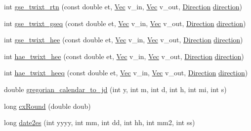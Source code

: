 \begin{DoxyCompactItemize}
\item 
int \hyperlink{cxform-manual_8c_a93d806df9cc3ace3eb999aabc0b200b7}{gse\-\_\-twixt\-\_\-rtn} (const double et, \hyperlink{cxform_8h_ae351b761259db318a538251033f3cb27}{Vec} v\-\_\-in, \hyperlink{cxform_8h_ae351b761259db318a538251033f3cb27}{Vec} v\-\_\-out, \hyperlink{cxform_8h_abc151ba67b4c70f0e8dc3fe894264aa1}{Direction} \hyperlink{cxform_8h_a99f26e6ee9fcd62f75203b5402df8098}{direction})
\item 
int \hyperlink{cxform-manual_8c_a448aadcdd0174393cbc77012b33584ca}{gse\-\_\-twixt\-\_\-gseq} (const double et, \hyperlink{cxform_8h_ae351b761259db318a538251033f3cb27}{Vec} v\-\_\-in, \hyperlink{cxform_8h_ae351b761259db318a538251033f3cb27}{Vec} v\-\_\-out, \hyperlink{cxform_8h_abc151ba67b4c70f0e8dc3fe894264aa1}{Direction} \hyperlink{cxform_8h_a99f26e6ee9fcd62f75203b5402df8098}{direction})
\item 
int \hyperlink{cxform-manual_8c_a968a6f43d870317c644d1e6dcc2ea66c}{gse\-\_\-twixt\-\_\-hee} (const double et, \hyperlink{cxform_8h_ae351b761259db318a538251033f3cb27}{Vec} v\-\_\-in, \hyperlink{cxform_8h_ae351b761259db318a538251033f3cb27}{Vec} v\-\_\-out, \hyperlink{cxform_8h_abc151ba67b4c70f0e8dc3fe894264aa1}{Direction} \hyperlink{cxform_8h_a99f26e6ee9fcd62f75203b5402df8098}{direction})
\item 
int \hyperlink{cxform-manual_8c_ab2f71cd8ff48427b63d28a87e18ebd09}{hae\-\_\-twixt\-\_\-hee} (const double et, \hyperlink{cxform_8h_ae351b761259db318a538251033f3cb27}{Vec} v\-\_\-in, \hyperlink{cxform_8h_ae351b761259db318a538251033f3cb27}{Vec} v\-\_\-out, \hyperlink{cxform_8h_abc151ba67b4c70f0e8dc3fe894264aa1}{Direction} \hyperlink{cxform_8h_a99f26e6ee9fcd62f75203b5402df8098}{direction})
\item 
int \hyperlink{cxform-manual_8c_a461e86e4d41f0ac1578a75a35a346015}{hae\-\_\-twixt\-\_\-heeq} (const double et, \hyperlink{cxform_8h_ae351b761259db318a538251033f3cb27}{Vec} v\-\_\-in, \hyperlink{cxform_8h_ae351b761259db318a538251033f3cb27}{Vec} v\-\_\-out, \hyperlink{cxform_8h_abc151ba67b4c70f0e8dc3fe894264aa1}{Direction} \hyperlink{cxform_8h_a99f26e6ee9fcd62f75203b5402df8098}{direction})
\item 
double \hyperlink{cxform-manual_8c_ab38449ac3ff3227ac30316a0155732ea}{gregorian\-\_\-calendar\-\_\-to\-\_\-jd} (int y, int m, int d, int h, int mi, int s)
\item 
long \hyperlink{cxform-manual_8c_a294c5778cf62becb5a42d27920344c6f}{cx\-Round} (double doub)
\item 
long \hyperlink{cxform-manual_8c_a5e51ba4e5ece049ac34832063e2c9a34}{date2es} (int yyyy, int mm, int dd, int hh, int mm2, int ss)
\end{DoxyCompactItemize}


